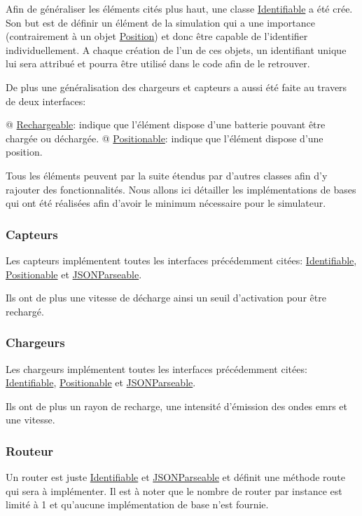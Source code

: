 \documentclass[final]{polytech/polytech}
\newcommand{\klass}[1]{\hyperref[class:#1]{#1}}
\begin{document}
				Afin de généraliser les éléments cités plus haut, une classe \klass{Identifiable} a été crée.
				Son but est de définir un élément de la simulation qui a une importance (contrairement à un objet \klass{Position}) et donc être capable de l'identifier individuellement.
				A chaque création de l'un de ces objets, un identifiant unique lui sera attribué et pourra être utilisé dans le code afin de le retrouver.
				
				De plus une généralisation des chargeurs et capteurs a aussi été faite au travers de deux interfaces:
				\begin{easylist}
					@ \klass{Rechargeable}: indique que l'élément dispose d'une batterie pouvant être chargée ou déchargée.
					@ \klass{Positionable}: indique que l'élément dispose d'une position.
				\end{easylist}
				
				Tous les éléments peuvent par la suite étendus par d'autres classes afin d'y rajouter des fonctionnalités.
				Nous allons ici détailler les implémentations de bases qui ont été réalisées afin d'avoir le minimum nécessaire pour le simulateur.
				
				\subsubsection{Capteurs}
					Les capteurs implémentent toutes les interfaces précédemment citées: \klass{Identifiable}, \klass{Positionable} et \klass{JSONParseable}.
					
					Ils ont de plus une vitesse de décharge ainsi un seuil d'activation pour être rechargé.
				
				\subsubsection{Chargeurs}
					Les chargeurs implémentent toutes les interfaces précédemment citées: \klass{Identifiable}, \klass{Positionable} et \klass{JSONParseable}.
					
					Ils ont de plus un rayon de recharge, une intensité d'émission des ondes \glspl{emr} et une vitesse.

				\subsubsection{Routeur}
					Un router est juste \klass{Identifiable} et \klass{JSONParseable} et définit une méthode route qui sera à implémenter.
					Il est à noter que le nombre de router par instance est limité à 1 et qu'aucune implémentation de base n'est fournie.
			
\end{document}
